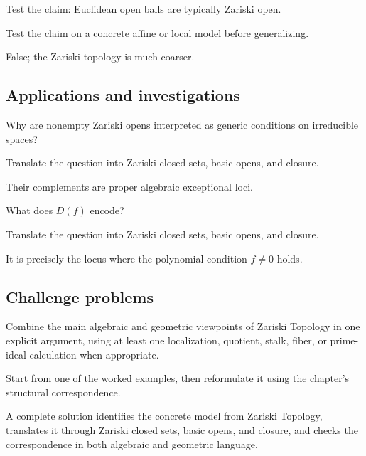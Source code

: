 \begin{exercise}\label{exr:vi02-expand-12}
Test the claim: Euclidean open balls are typically Zariski open.
\end{exercise}
\begin{hint}
Test the claim on a concrete affine or local model before generalizing.
\end{hint}
\begin{solution}
False; the Zariski topology is much coarser.
\end{solution}

\subsection*{Applications and investigations}

\begin{exercise}\label{exr:vi02-expand-13}
Why are nonempty Zariski opens interpreted as generic conditions on irreducible spaces?
\end{exercise}
\begin{hint}
Translate the question into Zariski closed sets, basic opens, and closure.
\end{hint}
\begin{solution}
Their complements are proper algebraic exceptional loci.
\end{solution}

\begin{exercise}\label{exr:vi02-expand-14}
What does $D(f)$ encode?
\end{exercise}
\begin{hint}
Translate the question into Zariski closed sets, basic opens, and closure.
\end{hint}
\begin{solution}
It is precisely the locus where the polynomial condition $f\ne0$ holds.
\end{solution}

\subsection*{Challenge problems}

\begin{exercise}\label{exr:vi02-expand-15}
Combine the main algebraic and geometric viewpoints of Zariski Topology in one explicit argument, using at least one localization, quotient, stalk, fiber, or prime-ideal calculation when appropriate.
\end{exercise}
\begin{hint}
Start from one of the worked examples, then reformulate it using the chapter's structural correspondence.
\end{hint}
\begin{solution}
A complete solution identifies the concrete model from Zariski Topology, translates it through Zariski closed sets, basic opens, and closure, and checks the correspondence in both algebraic and geometric language.
\end{solution}

